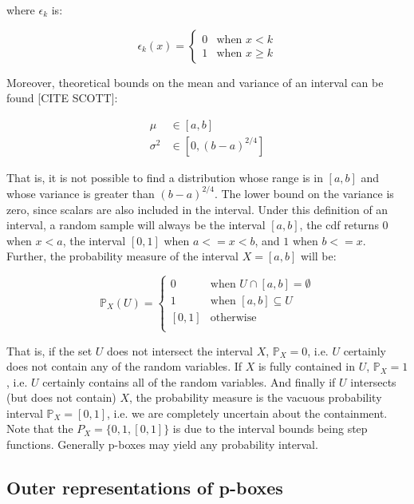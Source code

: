 \documentclass{juliacon}
\begin{document}
\noindent where $\epsilon_k$ is: 

\begin{equation*}
   \epsilon_k(x) = \begin{cases} 0 &\text{when } x < k \\ 1 &\text{when } x \geq k \end{cases}
\end{equation*}

Moreover, theoretical bounds on the mean and variance of an interval can be found [CITE SCOTT]:

\begin{align*}
  \mu &\in [a, b] \\
  \sigma^2 &\in [0, (b - a)^{2/4}]
\end{align*}

That is, it is not possible to find a distribution whose range is in $[a, b]$ and whose variance is greater than $(b-a)^{2/4}$. The lower bound on the variance is zero, since scalars are also included in the interval. Under this definition of an interval, a random sample will always be the interval $[a, b]$, the cdf returns 0 when $x < a$, the interval $[0,1]$ when $a <= x < b$, and $1$ when $b <= x$. Further, the probability measure of the interval $X = [a, b]$ will be: 

\begin{equation*}
  \mathbb{P}_{X}(U) = \begin{cases}
    0 & \text{when } U \cap [a,b] = \emptyset \\
    1 & \text{when } [a,b] \subseteq U  \\
    [0, 1] & \text{otherwise }\\
  \end{cases}
\end{equation*}

\noindent That is, if the set $U$ does not intersect the interval $X$, $\mathbb{P}_{X}=0$, i.e. $U$ certainly does not contain any of the random variables. If $X$ is fully contained in $U$, $\mathbb{P}_{X}=1$, i.e. $U$ certainly contains all of the random variables. And finally if $U$ intersects (but does not contain) $X$, the probability measure is the vacuous probability interval $\mathbb{P}_{X} = [0, 1]$, i.e. we are completely uncertain about the containment. Note that the $P_{X} = \{0, 1, [0,1]\}$ is due to the interval bounds being step functions. Generally p-boxes may yield any probability interval.

\subsection{Outer representations of p-boxes}
\end{document}
